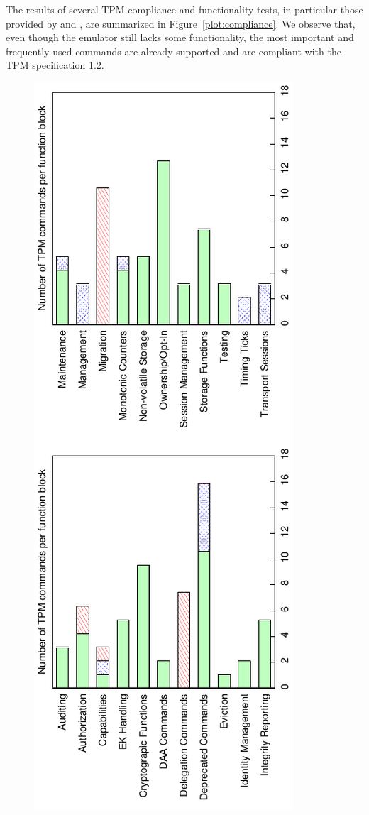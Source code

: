 \documentclass[11pt,letterpaper]{article}
\begin{document}
The results of several TPM compliance and functionality tests, in particular those provided by
\cite{trousers,ibmdaatest} and \cite{Sadeghi}, are summarized in Figure~\ref{plot:compliance}.
We observe that, even though the emulator still lacks some functionality, the most important and
frequently used commands are already supported and are compliant with the TPM specification 1.2.

\begin{figure}[h]
\centering
\includegraphics[angle=-90,scale=0.8]{plots/compliance}

\end{figure}
\end{document}
